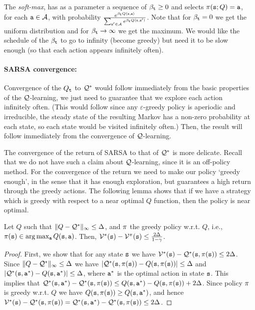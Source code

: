 The {\em soft-max}, has as a parameter a sequence of
$\beta_{\tt t}\geq 0$ and selects $\pi({\tt s};Q)={\tt a}$, for
each ${\tt a} \in \mathcal{A}$, with probability $\frac{e^{\beta_{\tt t}
Q({\tt s},{\tt a})}}{\sum_{{\tt a}'\in \mathcal{A}}e^{\beta_{\tt t}
Q({\tt s},{\tt a}')}}$. Note that for $\beta_{\tt t}=0$ we get the
uniform distribution and for $\beta_{\tt t}\rightarrow \infty$ we get
the maximum. We would like the schedule of the $\beta_{\tt t}$ to go
to infinity (become greedy) but need it to be slow enough (so that
each action appears infinitely often).

\begin{advanced}
\paragraph{SARSA convergence:}
Convergence of the $Q_{\tt t}$ to $\mathcal{Q}^*$ would follow immediately from
the basic properties of the $\mathcal{Q}$-learning, we just need to guarantee
that we explore each action infinitely often. (This would follow
since any $\varepsilon$-greedy policy is aperiodic and irreducible,
the steady state of the resulting Markov has a non-zero probability
at each state, so each state would be visited infinitely often.)
Then, the result will follow immediately from the convergence of
$\mathcal{Q}$-learning.

The convergence of the return of SARSA to that of $\mathcal{Q}^*$ is more
delicate. Recall that we do not have such a claim about
$\mathcal{Q}$-learning, since it is an off-policy method. For the convergence
of the return we need to make our policy `greedy enough', in the
sense that it has enough exploration, but guarantees a high return
through the greedy actions. The following lemma shows that if we
have a strategy which is greedy with respect to a near optimal $Q$
function, then the policy is near optimal.

\begin{lemma}
\label{lemma:Q-greedy-policy}
%
Let $Q$ such that $\| Q-\mathcal{Q}^*\|_\infty \leq \Delta$, and $\pi$ the
greedy policy w.r.t. $Q$, i.e., $\pi({\tt s})\in \arg\max_{\tt a}
Q({\tt s},{\tt a})$. Then,
$\mathcal{V}^*({\tt s})-\mathcal{V}^\pi({\tt s})\leq
\frac{2\Delta}{1-\gamma}$.
\end{lemma}
\begin{proof}
First, we show that for any state ${\tt s}$ we have
$\mathcal{V}^*({\tt s})-\mathcal{Q}^*({\tt s},\pi({\tt s}))\leq 2\Delta$. Since
$\| Q-\mathcal{Q}^*\|_\infty \leq \Delta$ we have
$|\mathcal{Q}^*({\tt s},\pi({\tt s}))-Q({\tt s},\pi({\tt s}))|\leq \Delta$
and $|\mathcal{Q}^*({\tt s},{\tt a}^*)-Q({\tt s},{\tt a}^*)|\leq \Delta$, where
${\tt a}^*$ is the optimal action in state ${\tt s}$. This implies that
%
$\mathcal{Q}^*({\tt s},{\tt a}^*)-\mathcal{Q}^*({\tt s},\pi({\tt s}))\leq
Q({\tt s},{\tt a}^*)-Q({\tt s},\pi({\tt s}))+2\Delta$.
%
Since policy $\pi$ is greedy w.r.t. $Q$ we have
$Q({\tt s},\pi({\tt s}))\geq Q({\tt s},{\tt a}^*)$, and hence
$\mathcal{V}^*({\tt s})-\mathcal{Q}^*({\tt s},\pi({\tt s}))=\mathcal{Q}^*({\tt s},{\tt a}^*)-\mathcal{Q}^*({\tt s},\pi({\tt s}))\leq
2\Delta$.



\end{proof}
\end{advanced}
